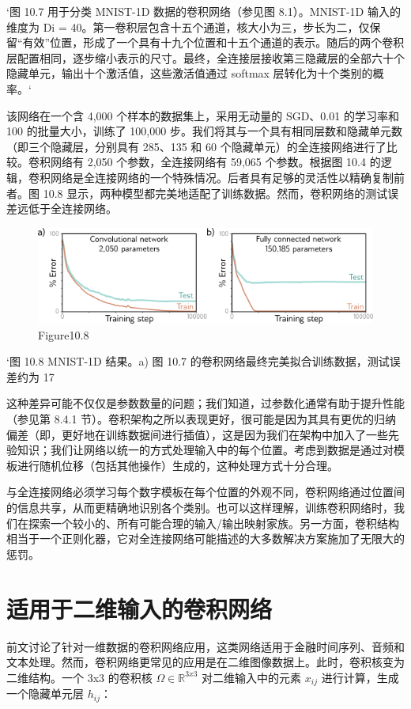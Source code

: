 `图 10.7 用于分类 MNIST-1D 数据的卷积网络（参见图 8.1）。MNIST-1D 输入的维度为 Di = 40。第一卷积层包含十五个通道，核大小为三，步长为二，仅保留“有效”位置，形成了一个具有十九个位置和十五个通道的表示。随后的两个卷积层配置相同，逐步缩小表示的尺寸。最终，全连接层接收第三隐藏层的全部六十个隐藏单元，输出十个激活值，这些激活值通过 softmax 层转化为十个类别的概率。`

该网络在一个含 4,000 个样本的数据集上，采用无动量的 SGD、0.01 的学习率和 100 的批量大小，训练了 100,000 步。我们将其与一个具有相同层数和隐藏单元数（即三个隐藏层，分别具有 285、135 和 60 个隐藏单元）的全连接网络进行了比较。卷积网络有 2,050 个参数，全连接网络有 59,065 个参数。根据图 10.4 的逻辑，卷积网络是全连接网络的一个特殊情况。后者具有足够的灵活性以精确复制前者。图 10.8 显示，两种模型都完美地适配了训练数据。然而，卷积网络的测试误差远低于全连接网络。


\begin{figure}[h!]
\centering
\includegraphics[width=0.7\linewidth]{png/chapter10/ConvMNIST1D.png}
\caption{Figure10.8}
\end{figure}

`图 10.8 MNIST-1D 结果。a) 图 10.7 的卷积网络最终完美拟合训练数据，测试误差约为 17%

这种差异可能不仅仅是参数数量的问题；我们知道，过参数化通常有助于提升性能（参见第 8.4.1 节）。卷积架构之所以表现更好，很可能是因为其具有更优的归纳偏差（即，更好地在训练数据间进行插值），这是因为我们在架构中加入了一些先验知识；我们让网络以统一的方式处理输入中的每个位置。考虑到数据是通过对模板进行随机位移（包括其他操作）生成的，这种处理方式十分合理。

与全连接网络必须学习每个数字模板在每个位置的外观不同，卷积网络通过位置间的信息共享，从而更精确地识别各个类别。也可以这样理解，训练卷积网络时，我们在探索一个较小的、所有可能合理的输入/输出映射家族。另一方面，卷积结构相当于一个正则化器，它对全连接网络可能描述的大多数解决方案施加了无限大的惩罚。
\section{适用于二维输入的卷积网络}
前文讨论了针对一维数据的卷积网络应用，这类网络适用于金融时间序列、音频和文本处理。然而，卷积网络更常见的应用是在二维图像数据上。此时，卷积核变为二维结构。一个 3x3 的卷积核 \(\Omega \in \mathbb{R}^{3x3}\) 对二维输入中的元素 \(x_{ij}\) 进行计算，生成一个隐藏单元层 \(h_{ij}\)：


